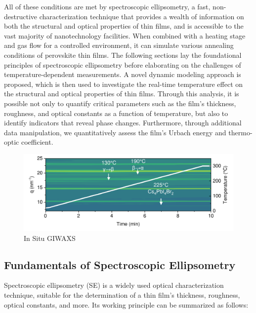 All of these conditions are met by spectroscopic ellipsometry, a fast, non-destructive characterization technique that provides a wealth of information on both the structural and optical properties of thin films, and is accessible to the vast majority of nanotechnology facilities. When combined with a heating stage and gas flow for a controlled environment, it can simulate various annealing conditions of perovskite thin films. The following sections lay the foundational principles of spectroscopic ellipsometry before elaborating on the challenges of temperature-dependent measurements. A novel dynamic modeling approach is proposed, which is then used to investigate the real-time temperature effect on the structural and optical properties of  thin films. Through this analysis, it is possible not only to quantify critical parameters such as the film's thickness, roughness, and optical constants as a function of temperature, but also to identify indicators that reveal phase changes. Furthermore, through additional data manipulation, we quantitatively assess the film's Urbach energy and thermo-optic coefficient.


\begin{figure}
  \centering
  \medskip
  \includegraphics[width=\textwidth]{chapters/material_properties/images/GIWAXS_In_Situ.pdf}
  \caption[Short caption for Table of Figures]{In Situ GIWAXS}
  \label{fig:ch2:giwaxs_insitu}
\end{figure}



\subsection{Fundamentals of Spectroscopic Ellipsometry} \label{ch:ellipsometry:intro}


Spectroscopic ellipsometry (SE) is a widely used optical characterization technique, suitable for the determination of a thin film's thickness, roughness, optical constants, and more. Its working principle can be summarized as follows: 

